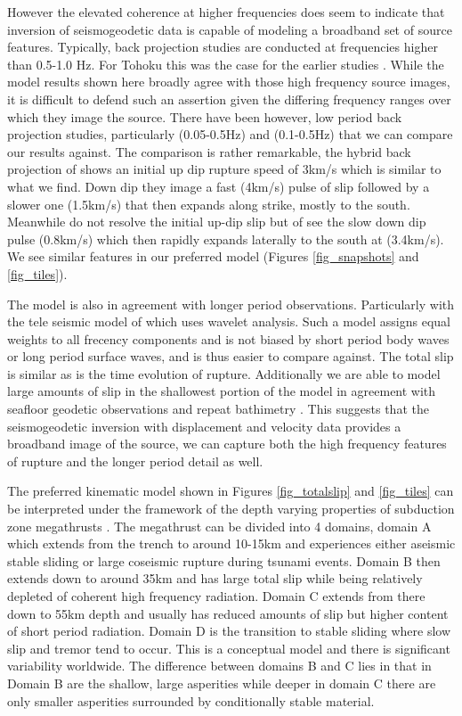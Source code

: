 However the elevated coherence at higher frequencies does seem to indicate that inversion of seismogeodetic data is capable of modeling a broadband set of source features. Typically, back projection studies are conducted at frequencies higher than 0.5-1.0 Hz. For Tohoku this was the case for the earlier studies \citep{wang2011bp}. While the model results shown here broadly agree with those high frequency source images, it is difficult to defend such an assertion given the differing frequency ranges over which they image the source. There have been however, low period back projection studies, particularly \citet{kiser2012} (0.05-0.5Hz) and \citet{yagi2012} (0.1-0.5Hz) that we can compare our results against. The comparison is rather remarkable, the hybrid back projection of \citet{yagi2012} shows an initial up dip rupture speed of 3km/s which is similar to what we find. Down dip they image a fast (4km/s) pulse of slip followed by a slower one (1.5km/s) that then expands along strike, mostly to the south. Meanwhile \citet{kiser2012} do not resolve the initial up-dip slip but of see the slow down dip pulse (0.8km/s) which then rapidly expands laterally to the south at (3.4km/s). We see similar features in our  preferred model (Figures \ref{fig_snapshots} and \ref{fig_tiles}). 

The model is also in agreement with longer period observations. Particularly with the tele seismic model of \citet{shao2011} which uses wavelet analysis. Such a model assigns equal weights to all frecency components and is not biased by short period body waves or long period surface waves, and is thus easier to compare against. The total slip is similar as is the time evolution of rupture. Additionally we are able to model large amounts of slip in the shallowest portion of the model in agreement with seafloor geodetic observations and repeat bathimetry \citep{fujiwara2011,sato2011}. This suggests that the seismogeodetic inversion with displacement and velocity data provides a broadband image of the source, we can capture both the high frequency features of rupture and the longer period detail as well.

The preferred kinematic model shown in Figures \ref{fig_totalslip} and \ref{fig_tiles} can be interpreted under the framework of the depth varying properties of subduction zone megathrusts \citep{lay2012}. The megathrust can be divided into 4 domains, domain A which extends from the trench to around 10-15km  and experiences either aseismic stable sliding or large coseismic rupture during tsunami events. Domain B then extends down to around 35km and has large total slip while being relatively depleted of coherent high frequency radiation. Domain C extends from there down to 55km depth and usually has reduced amounts of slip but higher content of short period radiation. Domain D is the transition to stable sliding where slow slip and tremor tend to occur. This is a conceptual model and there is significant variability worldwide. The difference between domains B and C lies in that in Domain B are the shallow, large asperities while deeper in domain C there are only smaller asperities surrounded by conditionally stable material.

